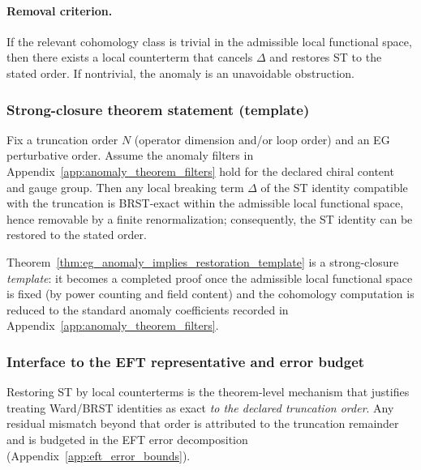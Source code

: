 \paragraph{Removal criterion.}
If the relevant cohomology class is trivial in the admissible local functional space, then there exists a local counterterm that cancels $\Delta$ and restores ST to the stated order.
If nontrivial, the anomaly is an unavoidable obstruction.

\subsubsection{Strong-closure theorem statement (template)}
\begin{theorem}
\label{thm:eg_anomaly_implies_restoration_template}
Fix a truncation order $N$ (operator dimension and/or loop order) and an EG perturbative order.
Assume the anomaly filters in Appendix~\ref{app:anomaly_theorem_filters} hold for the declared chiral content and gauge group.
Then any local breaking term $\Delta$ of the ST identity compatible with the truncation is BRST-exact within the admissible local functional space, hence removable by a finite renormalization; consequently, the ST identity can be restored to the stated order.
\end{theorem}

\AuditTag Theorem~\ref{thm:eg_anomaly_implies_restoration_template} is a strong-closure \emph{template}: it becomes a completed proof once the admissible local functional space is fixed (by power counting and field content) and the cohomology computation is reduced to the standard anomaly coefficients recorded in Appendix~\ref{app:anomaly_theorem_filters}.

\subsubsection{Interface to the EFT representative and error budget}
\InterfaceTag Restoring ST by local counterterms is the theorem-level mechanism that justifies treating Ward/BRST identities as exact \emph{to the declared truncation order}.
Any residual mismatch beyond that order is attributed to the truncation remainder and is budgeted in the EFT error decomposition (Appendix~\ref{app:eft_error_bounds}).

